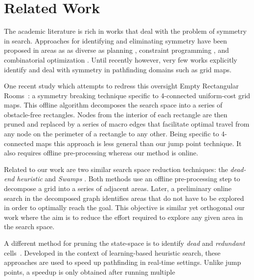 \section{Related Work}
\label{sec:relatedwork}
The academic literature is rich in works that deal with the problem of symmetry
in search.  Approaches for identifying and eliminating symmetry have been
proposed in areas as as diverse as planning \cite{fox99}, constraint programming
\cite{gent00}, and combinatorial optimization \cite{fukunaga08}. Until recently
however, very few works explicitly identify and deal with symmetry in pathfinding
domains such as grid maps.
\par
One recent study which attempts to redress this oversight 
Empty Rectangular Rooms~\cite{harabor10}: a symmetry breaking technique specific to 4-connected uniform-cost grid maps.
This offline algorithm decomposes the search space into a series of obstacle-free rectangles.
Nodes from the interior of each rectangle are then pruned and
replaced by a series of macro edges that facilitate optimal travel from any node
on the perimeter of a rectangle to any other.  Being specific to 4-connected
maps this approach is less general than our jump point technique. It also
requires offline pre-processing whereas our method is online.
\par
Related to our work are two similar search space reduction techniques: the
\emph{dead-end heuristic} \cite{bjornsson06} and \emph{Swamps} \cite{pochter10}.
Both methods use an offline pre-processing step to decompose a grid into a
series of adjacent areas.  Later, a preliminary online search in the decomposed
graph identifies areas that do not have to be explored in order to optimally
reach the goal.  This objective is similar yet orthogonal our work where
the aim is to reduce the effort required to explore any given area in the search
space.
\par
A different method for pruning the state-space is to identify \emph{dead} and 
\emph{redundant} cells~\cite{sturtevant10}.
Developed in the context of learning-based heuristic search, these approaches 
are used to speed up pathfinding in real-time settings.
Unlike jump points, a speedup is only obtained after running multiple 
